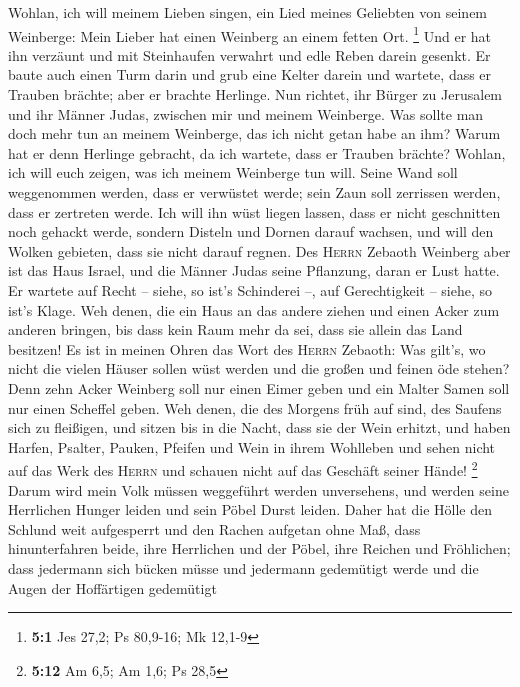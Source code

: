 Wohlan, ich will meinem Lieben singen, ein Lied meines
Geliebten von seinem Weinberge: Mein Lieber hat einen Weinberg an einem
fetten Ort. \footnote{\textbf{5:1} Jes 27,2; Ps 80,9-16; Mk 12,1-9}
 Und er hat ihn verzäunt und mit Steinhaufen verwahrt und
edle Reben darein gesenkt. Er baute auch einen Turm darin und grub eine
Kelter darein und wartete, dass er Trauben brächte; aber er brachte
Herlinge.  Nun richtet, ihr Bürger zu Jerusalem und ihr
Männer Judas, zwischen mir und meinem Weinberge.  Was
sollte man doch mehr tun an meinem Weinberge, das ich nicht getan habe
an ihm? Warum hat er denn Herlinge gebracht, da ich wartete, dass er
Trauben brächte?  Wohlan, ich will euch zeigen, was ich
meinem Weinberge tun will. Seine Wand soll weggenommen werden, dass er
verwüstet werde; sein Zaun soll zerrissen werden, dass er zertreten
werde.  Ich will ihn wüst liegen lassen, dass er nicht
geschnitten noch gehackt werde, sondern Disteln und Dornen darauf
wachsen, und will den Wolken gebieten, dass sie nicht darauf regnen.
 Des \textsc{Herrn} Zebaoth Weinberg aber ist das Haus
Israel, und die Männer Judas seine Pflanzung, daran er Lust hatte. Er
wartete auf Recht -- siehe, so ist's Schinderei --, auf Gerechtigkeit --
siehe, so ist's Klage.  Weh denen, die ein Haus an das
andere ziehen und einen Acker zum anderen bringen, bis dass kein Raum
mehr da sei, dass sie allein das Land besitzen!  Es ist in
meinen Ohren das Wort des \textsc{Herrn} Zebaoth: Was gilt's, wo nicht
die vielen Häuser sollen wüst werden und die großen und feinen öde
stehen?  Denn zehn Acker Weinberg soll nur einen Eimer
geben und ein Malter Samen soll nur einen Scheffel geben.
 Weh denen, die des Morgens früh auf sind, des Saufens
sich zu fleißigen, und sitzen bis in die Nacht, dass sie der Wein
erhitzt,  und haben Harfen, Psalter, Pauken, Pfeifen und
Wein in ihrem Wohlleben und sehen nicht auf das Werk des \textsc{Herrn}
und schauen nicht auf das Geschäft seiner Hände! \footnote{\textbf{5:12}
  Am 6,5; Am 1,6; Ps 28,5}  Darum wird mein Volk müssen
weggeführt werden unversehens, und werden seine Herrlichen Hunger leiden
und sein Pöbel Durst leiden.  Daher hat die Hölle den
Schlund weit aufgesperrt und den Rachen aufgetan ohne Maß, dass
hinunterfahren beide, ihre Herrlichen und der Pöbel, ihre Reichen und
Fröhlichen;  dass jedermann sich bücken müsse und
jedermann gedemütigt werde und die Augen der Hoffärtigen gedemütigt
